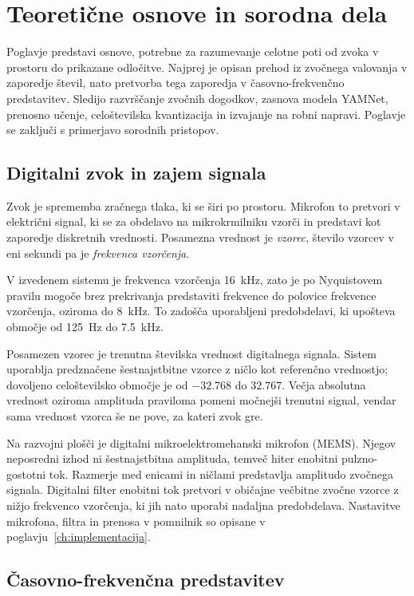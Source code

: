 \chapter{Teoretične osnove in sorodna dela}
\label{ch:teorija}

Poglavje predstavi osnove, potrebne za razumevanje celotne poti od
zvoka v prostoru do prikazane odločitve. Najprej je opisan prehod iz zvočnega
valovanja v zaporedje števil, nato pretvorba tega zaporedja v časovno-frekvenčno
predstavitev. Sledijo razvrščanje zvočnih dogodkov, zasnova modela YAMNet,
prenosno učenje, celoštevilska kvantizacija in izvajanje na robni napravi.
Poglavje se zaključi s primerjavo sorodnih pristopov.

\section{Digitalni zvok in zajem signala}

Zvok je sprememba zračnega tlaka, ki se širi po prostoru. Mikrofon to pretvori
v električni signal, ki se za obdelavo na mikrokrmilniku vzorči in predstavi kot
zaporedje diskretnih vrednosti. Posamezna vrednost je \emph{vzorec}, število
vzorcev v eni sekundi pa je \emph{frekvenca vzorčenja}.

V izvedenem sistemu je frekvenca vzorčenja \SI{16}{\kilo\hertz}, zato je po Nyquistovem
pravilu mogoče brez prekrivanja predstaviti frekvence do polovice frekvence vzorčenja, oziroma
do \SI{8}{\kilo\hertz}. To zadošča uporabljeni predobdelavi, ki upošteva območje
od \SI{125}{\hertz} do \SI{7.5}{\kilo\hertz}.

Posamezen vzorec je trenutna številska vrednost digitalnega signala. Sistem
uporablja predznačene šestnajstbitne vzorce z ničlo kot referenčno vrednostjo;
dovoljeno celoštevilsko območje je od $-32.768$ do $32.767$. Večja absolutna
vrednost oziroma amplituda praviloma pomeni močnejši trenutni signal, vendar sama vrednost vzorca
še ne pove, za kateri zvok gre.

Na razvojni plošči je digitalni mikroelektromehanski mikrofon (MEMS). Njegov neposredni
izhod ni šestnajstbitna amplituda, temveč hiter enobitni pulzno-gostotni tok.
Razmerje med enicami in ničlami predstavlja amplitudo zvočnega signala.
Digitalni filter enobitni tok pretvori v običajne večbitne zvočne vzorce z
nižjo frekvenco vzorčenja, ki jih nato uporabi nadaljna predobdelava.
Nastavitve mikrofona, filtra in prenosa v pomnilnik so opisane v
poglavju~\ref{ch:implementacija}.

\section{Časovno-frekvenčna predstavitev}


